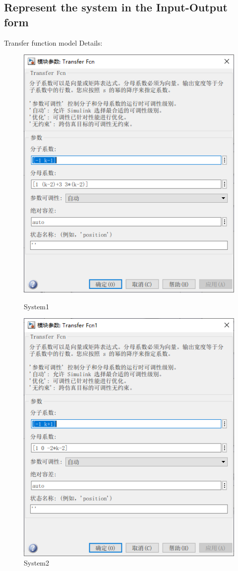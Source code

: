 \documentclass[12pt,a4paper,oneside]{ctexart}
\begin{document}
    \subsection{Represent the system in the Input-Output form}
    Transfer function model Details:
    \newpage
    \begin{figure}[H]
        \includegraphics[height = 0.35\textheight]{../screenshots/MT1S1Tran.PNG}
        \caption{System1}
        \includegraphics[height = 0.35\textheight]{../screenshots/MT1S2Tran.PNG}
        \caption{System2}
    \end{figure}
\end{document}
